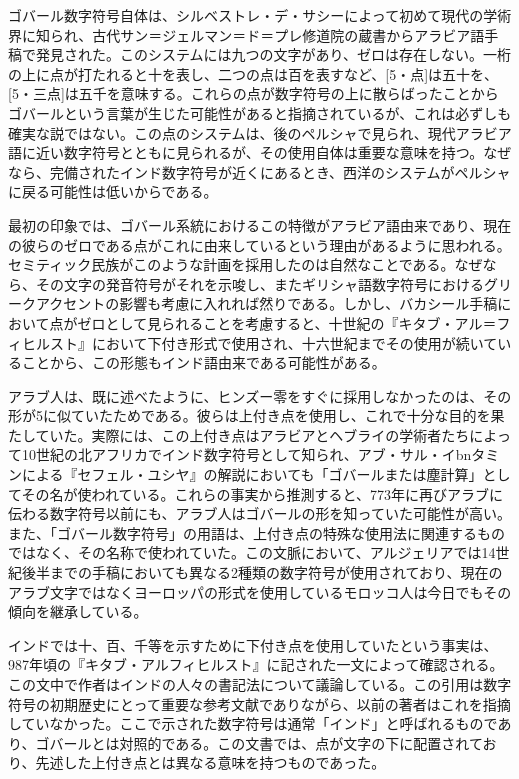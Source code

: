 \documentclass[a4paper,11pt,openany]{ltjsbook}
\begin{document}
ゴバール数字符号自体は、シルベストレ・デ・サシーによって初めて現代の学術界に知られ、古代サン＝ジェルマン＝ド＝プレ修道院の蔵書からアラビア語手稿で発見された。このシステムには九つの文字があり、ゼロは存在しない。一桁の上に点が打たれると十を表し、二つの点は百を表すなど、[5・点]は五十を、[5・三点]は五千を意味する。これらの点が数字符号の上に散らばったことからゴバールという言葉が生じた可能性があると指摘されているが、これは必ずしも確実な説ではない。この点のシステムは、後のペルシャで見られ、現代アラビア語に近い数字符号とともに見られるが、その使用自体は重要な意味を持つ。なぜなら、完備されたインド数字符号が近くにあるとき、西洋のシステムがペルシャに戻る可能性は低いからである。

最初の印象では、ゴバール系統におけるこの特徴がアラビア語由来であり、現在の彼らのゼロである点がこれに由来しているという理由があるように思われる。セミティック民族がこのような計画を採用したのは自然なことである。なぜなら、その文字の発音符号がそれを示唆し、またギリシャ語数字符号におけるグリークアクセントの影響も考慮に入れれば然りである。しかし、バカシール手稿において点がゼロとして見られることを考慮すると、十世紀の『キタブ・アル＝フィヒルスト』において下付き形式で使用され、十六世紀までその使用が続いていることから、この形態もインド語由来である可能性がある。

アラブ人は、既に述べたように、ヒンズー零をすぐに採用しなかったのは、その形が5に似ていたためである。彼らは上付き点を使用し、これで十分な目的を果たしていた。実際には、この上付き点はアラビアとヘブライの学術者たちによって10世紀の北アフリカでインド数字符号として知られ、アブ・サル・イbnタミンによる『セフェル・ユシヤ』の解説においても「ゴバールまたは塵計算」としてその名が使われている。これらの事実から推測すると、773年に再びアラブに伝わる数字符号以前にも、アラブ人はゴバールの形を知っていた可能性が高い。また、「ゴバール数字符号」の用語は、上付き点の特殊な使用法に関連するものではなく、その名称で使われていた。この文脈において、アルジェリアでは14世紀後半までの手稿においても異なる2種類の数字符号が使用されており、現在のアラブ文字ではなくヨーロッパの形式を使用しているモロッコ人は今日でもその傾向を継承している。

インドでは十、百、千等を示すために下付き点を使用していたという事実は、987年頃の『キタブ・アルフィヒルスト』に記された一文によって確認される。この文中で作者はインドの人々の書記法について議論している。この引用は数字符号の初期歴史にとって重要な参考文献でありながら、以前の著者はこれを指摘していなかった。ここで示された数字符号は通常「インド」と呼ばれるものであり、ゴバールとは対照的である。この文書では、点が文字の下に配置されており、先述した上付き点とは異なる意味を持つものであった。
\end{document}
